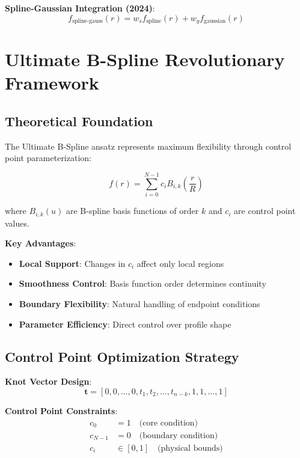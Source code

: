 \documentclass[11pt,a4paper]{article}
\begin{document}
\textbf{Spline-Gaussian Integration (2024)}:
\begin{equation}
f_{\text{spline-gauss}}(r) = w_s f_{\text{spline}}(r) + w_g f_{\text{gaussian}}(r)
\end{equation}

\section{Ultimate B-Spline Revolutionary Framework}

\subsection{Theoretical Foundation}

The Ultimate B-Spline ansatz represents maximum flexibility through control point parameterization:

\begin{equation}
f(r) = \sum_{i=0}^{N-1} c_i B_{i,k}\left(\frac{r}{R}\right)
\end{equation}

where $B_{i,k}(u)$ are B-spline basis functions of order $k$ and $c_i$ are control point values.

\textbf{Key Advantages}:
\begin{itemize}
\item \textbf{Local Support}: Changes in $c_i$ affect only local regions
\item \textbf{Smoothness Control}: Basis function order determines continuity
\item \textbf{Boundary Flexibility}: Natural handling of endpoint conditions
\item \textbf{Parameter Efficiency}: Direct control over profile shape
\end{itemize}

\subsection{Control Point Optimization Strategy}

\textbf{Knot Vector Design}:
\begin{equation}
\mathbf{t} = [0, 0, \ldots, 0, t_1, t_2, \ldots, t_{n-k}, 1, 1, \ldots, 1]
\end{equation}

\textbf{Control Point Constraints}:
\begin{align}
c_0 &= 1 \quad \text{(core condition)} \\
c_{N-1} &= 0 \quad \text{(boundary condition)} \\
c_i &\in [0, 1] \quad \text{(physical bounds)}
\end{align}
\end{document}
